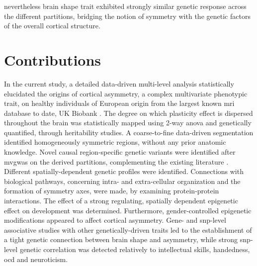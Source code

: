 nevertheless brain shape trait exhibited strongly similar genetic response \cite{Naqvi2021} across the different partitions, bridging the notion of symmetry with the genetic factors of the overall cortical structure. 


\section{Contributions}
In the current study, a detailed  data-driven multi-level analysis statistically elucidated the origins of cortical asymmetry, a complex multivariate phenotypic trait, on healthy individuals of European origin from the largest known \ac{mri} database to date, UK Biobank \cite{Littlejohns2020}. The degree on which plasticity effect is dispersed throughout the brain was statistically mapped using 2-way \ac{anova} and genetically quantified, through heritability studies. A coarse-to-fine data-driven segmentation identified homogeneously symmetric regions, without any prior anatomic knowledge.  Novel causal region-specific genetic variants were identified after \ac{mvgwas} on the derived partitions, complementing the existing literature \cite{Sha2021}. Different spatially-dependent genetic profiles were identified. Connections with biological pathways, concerning intra- and extra-cellular organization and the formation of symmetry axes, were made, by examining protein-protein interactions. The effect of a strong regulating, spatially dependent epigenetic effect on development was determined. Furthermore, gender-controlled epigenetic modifications appeared to affect cortical asymmetry. Gene- and \ac{snp}-level associative studies  with other genetically-driven traits led to the establishment of a tight genetic connection between  brain shape and asymmetry, while strong \ac{snp}-level genetic correlation was detected relatively to intellectual skills, handedness, \ac{ocd} and neuroticism.  

